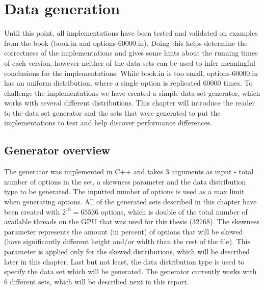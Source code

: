 \chapter{Data generation}
\label{chapter:datageneration}
Until this point, all implementations have been tested and validated on examples from the book (book.in and options-60000.in). Doing this helps determine the correctness of the implementations and gives some hints about the running times of each version, however neither of the data sets can be used to infer meaningful conclusions for the implementations. While book.in is too small, options-60000.in has an uniform distribution, where a single option is replicated 60000 times. To challenge the implementations we have created a simple data set generator, which works with several different distributions. This chapter will introduce the reader to the data set generator and the sets that were generated to put the implementations to test and help discover performance differences.   

\section{Generator overview}
The generator was implemented in C++ and takes 3 arguments as input - total number of options in the set, a skewness parameter and the data distribution type to be generated. The inputted number of options is used as a max limit when generating options. All of the generated sets described in this chapter have been created with $2^16=65536$ options, which is double of the total number of available threads on the GPU that was used for this thesis (32768). The skewness parameter represents the amount (in percent) of options that will be skewed (have significantly different height and/or width than the rest of the file). This parameter is applied only for the skewed distributions, which will be described later in this chapter. Last but not least, the data distribution type is used to specify the data set which will be generated. The generator currently works with 6 different sets, which will be described next in this report. 

